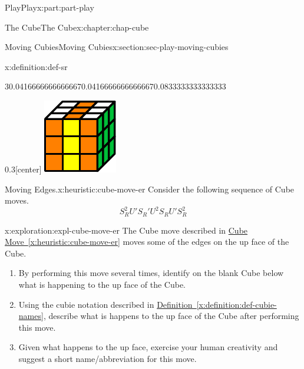 \documentclass[oneside,10pt,]{book}
\newcommand{\xreffont}{\relax}
\numberwithin{equation}{section}
\begin{document}
\begin{partptx}{Play}{}{Play}{}{}{x:part:part-play}
\begin{chapterptx}{The Cube}{}{The Cube}{}{}{x:chapter:chap-cube}
\begin{sectionptx}{Moving Cubies}{}{Moving Cubies}{}{}{x:section:sec-play-moving-cubies}
\begin{definition}{}{x:definition:def-sr}
\begin{sidebyside}{3}{0.0416666666666667}{0.0416666666666667}{0.0833333333333333}
\begin{sbspanel}{0.3}[center]
\includegraphics[width=\linewidth]{./images/middle_slice.pdf}
\end{sbspanel}%
\end{sidebyside}%
\end{definition}
\begin{heuristic}{Moving Edges.}{}{x:heuristic:cube-move-er}%
%
Consider the following sequence of Cube moves.%
%
\begin{equation*}
S_R^2 U' S_R' U^2 S_R U' S_R^2
\end{equation*}
\end{heuristic}
\begin{exploration}{}{x:exploration:expl-cube-move-er}%
The Cube move described in \hyperref[x:heuristic:cube-move-er]{Cube Move~{\xreffont\ref{x:heuristic:cube-move-er}}} moves some of the edges on the up face of the Cube.%
%
\begin{enumerate}
\item{}By performing this move several times, identify on the blank Cube below what is happening to the up face of the Cube.%
\item{}Using the cubie notation described in \hyperref[x:definition:def-cubie-names]{Definition~{\xreffont\ref{x:definition:def-cubie-names}}}, describe what is happens to the up face of the Cube after performing this move.%
\item{}Given what happens to the up face, exercise your human creativity and suggest a short name\slash{}abbreviation for this move.%

\end{enumerate}
\end{exploration}
\end{sectionptx}
\end{chapterptx}
\end{partptx}
\end{document}
